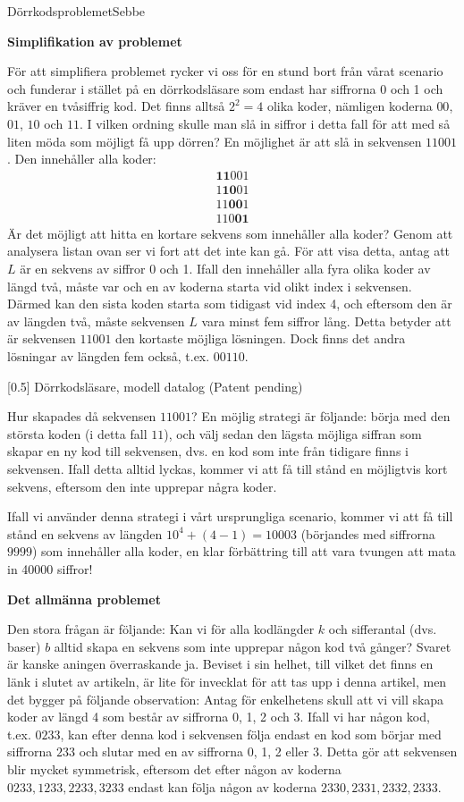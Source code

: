 \documentclass{spektraklet}
\begin{document}
\begin{artikel}{Dörrkodsproblemet}{Sebbe}
\begin{twocolumns}
\textbf{Simplifikation av problemet}

För att simplifiera problemet rycker vi oss för en stund bort från vårat scenario och funderar i stället på en dörrkodsläsare som endast har siffrorna 0 och 1 och kräver en tvåsiffrig kod. Det finns alltså $ 2^2 = 4$ olika koder, nämligen koderna $ 00$, $ 01$, $ 10$ och $ 11$. I vilken ordning skulle man slå in siffror i detta fall för att med så liten möda som möjligt få upp dörren? En möjlighet är att slå in sekvensen $ 11001$. Den innehåller alla koder:
\begin{align*}
  \boldsymbol{11}001 \\
  1\boldsymbol{10}01 \\
  11\boldsymbol{00}1 \\
  110\boldsymbol{01}   
\end{align*}
Är det möjligt att hitta en kortare sekvens som innehåller alla koder? Genom att analysera listan ovan ser vi fort att det inte kan gå. För att visa detta, antag att $ L$ är en sekvens av siffror 0 och 1. Ifall den innehåller alla fyra olika koder av längd två, måste var och en av koderna starta vid olikt index i sekvensen. Därmed kan den sista koden starta som tidigast vid index 4, och eftersom den är av längden två, måste sekvensen $L$ vara minst fem siffror lång. Detta betyder att är sekvensen $ 11001$ den kortaste möjliga lösningen. Dock finns det andra lösningar av längden fem också, t.ex. $ 00110$.

[0.5\columnwidth]
Dörrkodsläsare, modell datalog (Patent pending)

Hur skapades då sekvensen $11001$? En möjlig strategi är följande: börja med den största koden (i detta fall $ 11$), och välj sedan den lägsta möjliga siffran som skapar en ny kod till sekvensen, dvs. en kod som inte från tidigare finns i sekvensen. Ifall detta alltid lyckas, kommer vi att få till stånd en möjligtvis kort sekvens, eftersom den inte upprepar några koder.

Ifall vi använder denna strategi i vårt ursprungliga scenario, kommer vi att få till stånd en sekvens av längden $ 10^4 + (4-1) = 10003$ (börjandes med siffrorna $ 9999$) som innehåller alla koder, en klar förbättring till att vara tvungen att mata in 40000 siffror!

\textbf{Det allmänna problemet}

Den stora frågan är följande: Kan vi för alla kodlängder $ k$ och sifferantal (dvs. baser) $ b$ alltid skapa en sekvens som inte upprepar någon kod två gånger? Svaret är kanske aningen överraskande ja. Beviset i sin helhet, till vilket det finns en länk i slutet av artikeln, är lite för invecklat för att tas upp i denna artikel, men det bygger på följande observation: Antag för enkelhetens skull att vi vill skapa koder av längd 4 som består av siffrorna 0, 1, 2 och 3. Ifall vi har någon kod, t.ex. $ 0233$, kan efter denna kod i sekvensen följa endast en kod som börjar med siffrorna $ 233$ och slutar med en av siffrorna 0, 1, 2 eller 3. Detta gör att sekvensen blir mycket symmetrisk, eftersom det efter någon av koderna $ 0233, 1233, 2233, 3233$ endast kan följa någon av koderna $ 2330, 2331, 2332, 2333$.


\end{twocolumns}
\end{artikel}
\end{document}
